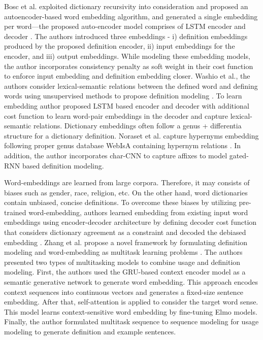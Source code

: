 Bosc et al. exploited dictionary recursivity into consideration and proposed an
autoencoder-based word embedding algorithm, and generated a single embedding per
word—the proposed auto-encoder model comprises of LSTM encoder and decoder
\cite{bosc_auto_2018}. The authors introduced three embeddings - i) definition
embeddings produced by the proposed definition encoder, ii) input embeddings for
the encoder, and iii) output embeddings. While modeling these embedding models,
the author incorporates consistency penalty as soft weight in their cost
function to enforce input embedding and definition embedding closer. Washio et
al., the authors consider lexical-semantic relations between the defined word
and defining words using unsupervised methods to propose definition modeling
\cite{washio_bridging_2019}. To learn embedding author proposed LSTM based
encoder and decoder with additional cost function to learn word-pair embeddings
in the decoder and capture lexical-semantic relations. Dictionary embeddings
often follow a genus + differentia structure for a dictionary definition.
Noraset et al. capture hypernyms embedding following proper genus database
WebIsA containing hypernym relations \cite{noraset_definition_2016}. In
addition, the author incorporates char-CNN to capture affixes to model gated-RNN
based definition modeling.

Word-embeddings are learned from large corpora. Therefore, it may consists of
biases such as gender, race, religion, etc. On the other hand, word dictionaries
contain unbiased, concise definitions. To overcome these biases by utilizing
pre-trained word-embedding, authors learned embedding from existing input word
embeddings using encoder-decoder architecture by defining decoder cost function
that considers dictionary agreement as a constraint and decoded the debiased
embedding \cite{kaneko_dictionary_2021}. Zhang et al. propose a novel framework
by formulating definition modeling and word-embedding as multitask learning
problems \cite{zhang_improving_2020}. The authors presented two types of
multitasking models to combine usage and definition modeling. First, the authors
used the GRU-based context encoder model as a semantic generative network to
generate word embedding. This approach encodes context sequences into continuous
vectors and generates a fixed-size sentence embedding. After that,
self-attention is applied to consider the target word sense. This model learns
context-sensitive word embedding by fine-tuning Elmo models. Finally, the author
formulated multitask sequence to sequence modeling for usage modeling to
generate definition and example sentences.
